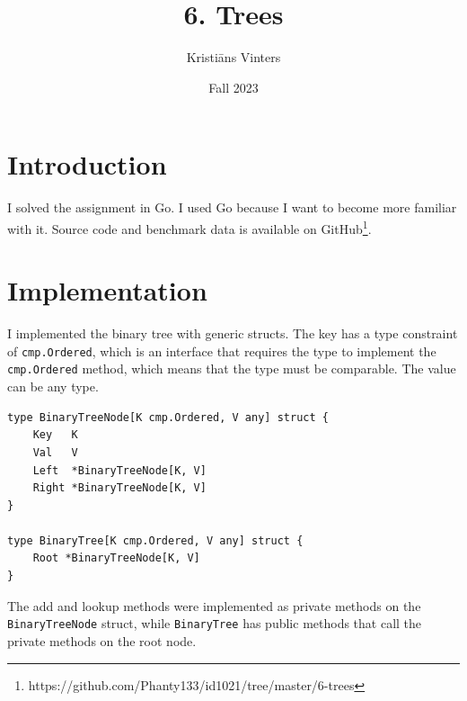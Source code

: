 \documentclass[a4paper,11pt]{article}
\title{\textbf{6. Trees}}
\author{Kristiāns Vinters}
\date{Fall 2023}
\begin{document}
    \maketitle
    \section*{Introduction}

    I solved the assignment in Go. I used Go because I want to become more familiar with it. Source code and benchmark data is available on GitHub\footnote[1]{https://github.com/Phanty133/id1021/tree/master/6-trees}.

    \section*{Implementation}

    I implemented the binary tree with generic structs. The key has a type constraint of \texttt{cmp.Ordered}, which is an interface that requires the type to implement the \texttt{cmp.Ordered} method, which means that the type must be comparable. The value can be any type.

    \begin{verbatim}
type BinaryTreeNode[K cmp.Ordered, V any] struct {
    Key   K
    Val   V
    Left  *BinaryTreeNode[K, V]
    Right *BinaryTreeNode[K, V]
}

type BinaryTree[K cmp.Ordered, V any] struct {
    Root *BinaryTreeNode[K, V]
}
    \end{verbatim}

    The add and lookup methods were implemented as private methods on the \texttt{BinaryTreeNode} struct, while \texttt{BinaryTree} has public methods that call the private methods on the root node.
\end{document}
